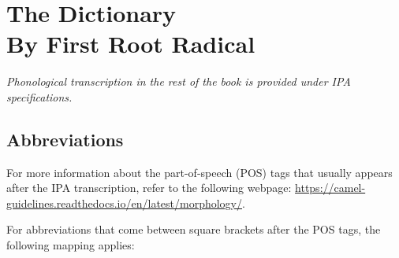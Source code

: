 \documentclass[11pt]{book}
\begin{document}




\mainmatter
\chapter*{\normalfont\fontsize{40}{40}\selectfont \textbf{The Dictionary \\ {\normalfont\fontsize{30}{30}\selectfont By First Root Radical}}}
%

\textit{Phonological transcription in the rest of the book is provided under IPA specifications.}
\thispagestyle{empty}

\newpage
\thispagestyle{empty}
\section*{Abbreviations}
%

For more information about the part-of-speech (POS) tags that usually appears after the IPA transcription, refer to the following webpage: \url{https://camel-guidelines.readthedocs.io/en/latest/morphology/}.

\vspace{5mm}
For abbreviations that come between square brackets after the POS tags, the following mapping applies:
\end{document}
